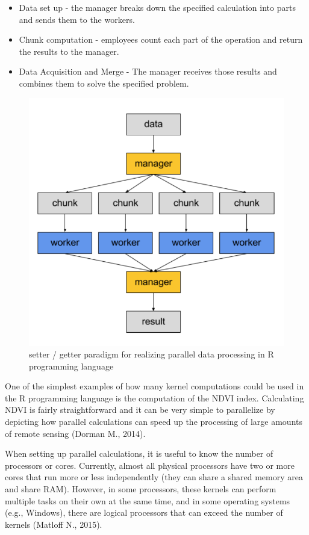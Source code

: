 {{{	\begin{itemize}
		\item Data set up - the manager breaks down the specified calculation into parts and sends them to the workers.
		\item Chunk computation - employees count each part of the operation and return the results to the manager.
		\item Data Acquisition and Merge - The manager receives those results and combines them to solve the specified problem.
	\end{itemize}

	\begin{figure}[H]
		\centering
		\includegraphics[width=0.9\linewidth]{images/parallel_execution_model.png}
		\caption{setter / getter paradigm for realizing parallel data processing in R programming language}
		\label{fig:par_exec_model}
	\end{figure}

	One of the simplest examples of how many kernel computations could be used in the R programming language is the computation of the NDVI index. Calculating NDVI is fairly straightforward and it can be very simple to parallelize by depicting how parallel calculations can speed up the processing of large amounts of remote sensing (Dorman M., 2014).
	
	When setting up parallel calculations, it is useful to know the number of processors or cores. Currently, almost all physical processors have two or more cores that run more or less independently (they can share a shared memory area and share RAM). However, in some processors, these kernels can perform multiple tasks on their own at the same time, and in some operating systems (e.g., Windows), there are logical processors that can exceed the number of kernels (Matloff N., 2015).
	
}}}
